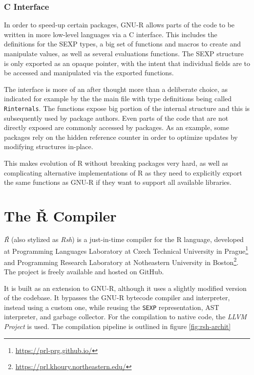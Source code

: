 \subsubsection*{C Interface}

In order to speed-up certain packages, GNU-R allows parts of the code to be written in more low-level languages via a C interface. This includes the definitions for the SEXP types, a big set of functions and macros to create and manipulate values, as well as several evaluations functions. The SEXP structure is only exported as an opaque pointer, with the intent that individual fields are to be accessed and manipulated via the exported functions.

The interface is more of an after thought more than a deliberate choice, as indicated for example by the the main file with type definitions being called \texttt{Rinternals}. The functions expose big portion of the internal structure and this is subsequently used by package authors. Even parts of the code that are not directly exposed are commonly accessed by packages. As an example, some packages rely on the hidden reference counter in order to optimize updates by modifying structures in-place.

This makes evolution of R without breaking packages very hard, as well as complicating alternative implementations of R as they need to explicitly export the same functions as GNU-R if they want to support all available libraries.

\newpage
\section{The Ř Compiler}

\textit{Ř} (also stylized as \textit{Rsh}) is a just-in-time compiler for the R language, developed at Programming Languages Laboratory at Czech Technical University in Prague\footnote{\url{https://prl-prg.github.io/}} and Programming Research Laboratory at Notheastern University in Boston\footnote{\url{https://prl.khoury.northeastern.edu/}}. The project is freely available and hosted on GitHub\cite{rsh-github}.

It is built as an extension to GNU-R, although it uses a slightly modified version of the codebase. It bypasses the GNU-R bytecode compiler and interpreter, instead using a custom one, while reusing the \texttt{SEXP} representation, AST interpreter, and garbage collector. For the compilation to native code, the \textit{LLVM Project}\cite{llvm} is used. The compilation pipeline is outlined in figure \ref{fig:rsh-archit}

